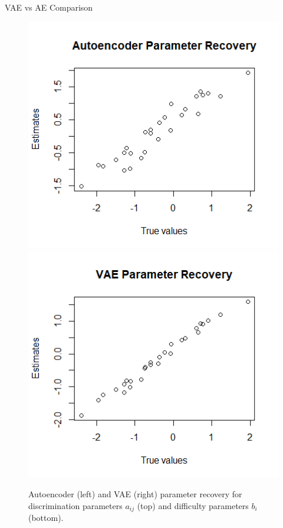 \documentclass{beamer}
\theoremstyle{definition}
\begin{document}
\begin{frame}{VAE vs AE Comparison}
\begin{figure}[h!]
\includegraphics[width=\textwidth]{../img/aied_results/ae_b_corr.png}
\endminipage\hfill
{}
\includegraphics[width=\textwidth]{../img/aied_results/vae_b_corr.png}
\endminipage\hfill
\caption{Autoencoder (left) and VAE (right) parameter recovery for discrimination parameters $a_{ij}$ (top) and difficulty parameters $b_i$ (bottom).}
\label{fig:b_corr}
\end{figure}
\end{frame}
\end{document}
